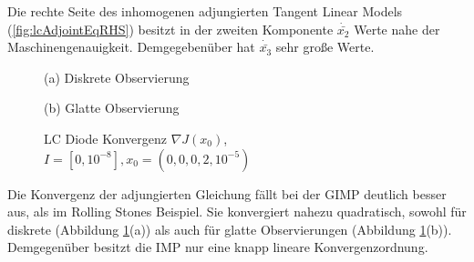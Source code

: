 Die rechte Seite des inhomogenen adjungierten Tangent Linear Models (\ref{fig:lcAdjointEqRHS}) besitzt in der zweiten Komponente  $\dot{\bar{x_2}}$ Werte nahe der Maschinengenauigkeit. Demgegebenüber hat $\dot{\bar{x_3}}$ sehr große Werte.
\begin{figure}[H]
\footnotesize 
\centering
\begin{minipage}[b]{0.49\linewidth}

\caption*{(a) Diskrete Observierung}
\end{minipage}
\begin{minipage}[b]{0.49\linewidth}

\caption*{(b) Glatte Observierung}
\end{minipage}
% 
% 
\caption{LC Diode Konvergenz $\nabla J(x_0)$, \\$I=[0,10^{-8}],x_0=(0,0,0,2,10^{-5}) $}
\label{fig:lcAdjointConvergence}
\end{figure}

Die Konvergenz der adjungierten Gleichung fällt bei der GIMP deutlich besser aus, als im Rolling Stones Beispiel. Sie konvergiert nahezu quadratisch, sowohl für diskrete (Abbildung \ref{fig:lcAdjointConvergence}(a)) als auch für glatte Observierungen (Abbildung \ref{fig:lcAdjointConvergence}(b)). Demgegenüber besitzt die IMP nur eine knapp lineare Konvergenzordnung.


